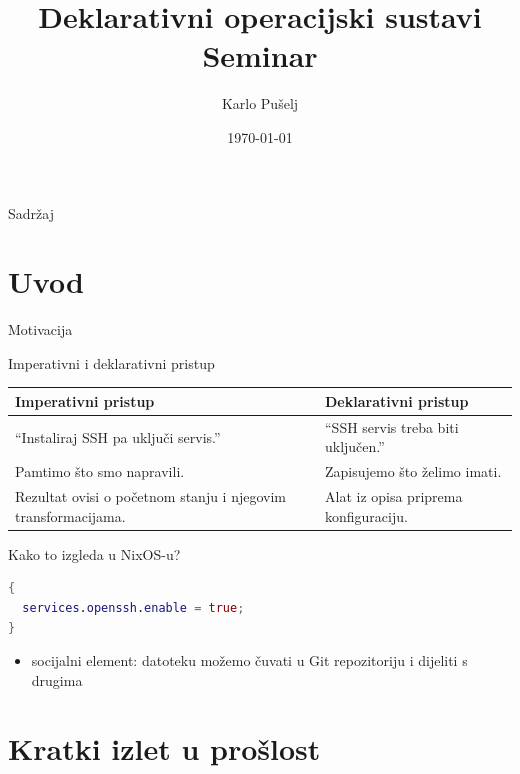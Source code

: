 \documentclass{beamer}
\title[Deklarativni operacijski sustavi]
{Deklarativni operacijski sustavi \\
Seminar}
\author[Karlo Pušelj]{Karlo Pušelj}
\institute[PMF--MO]{Prirodoslovno-matematički fakultet --- Matematički odsjek\\Sveučilište u Zagrebu}
\date{\today}
\begin{document}
\begin{frame}[plain]
	\titlepage
\end{frame}

\begin{frame}{Sadržaj}
	\tableofcontents
\end{frame}

\section{Uvod}

\begin{frame}{Motivacija}
\end{frame}

\begin{frame}{Imperativni i deklarativni pristup}
	\vskip25pt
	{\small
		\renewcommand{\arraystretch}{1.3}
		\begin{tabular}{>{\raggedright\arraybackslash}p{5.0cm} >{\raggedright\arraybackslash}p{5.0cm}}
			\toprule
			\textbf{Imperativni pristup}                                  & \textbf{Deklarativni pristup}             \\
			\midrule
			\enquote{Instaliraj SSH pa uključi servis.}                   & \enquote{SSH servis treba biti uključen.} \\
			Pamtimo što smo napravili.                                    & Zapisujemo što želimo imati.              \\
			Rezultat ovisi o početnom stanju i njegovim transformacijama. & Alat iz opisa priprema konfiguraciju.     \\
			\bottomrule
		\end{tabular}}
\end{frame}

\begin{frame}[fragile]{Kako to izgleda u NixOS-u?}
	\begin{lstlisting}[language=nix]
{
  services.openssh.enable = true;
}
\end{lstlisting}
	\begin{itemize}
		\item socijalni element: datoteku možemo čuvati u Git repozitoriju i dijeliti s drugima
	\end{itemize}
\end{frame}

\section{Kratki izlet u prošlost}
\end{document}
